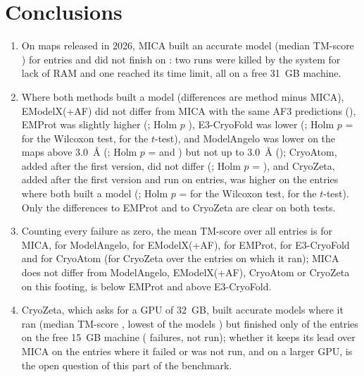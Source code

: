 \section{Conclusions}\label{sec:conclusions}
\begin{enumerate}
\item On \NEntries{} maps released in 2026, MICA built an accurate model (median TM-score \TmMedMica{}) for \NModelMica{} entries and did not finish on \NFailedMica{}: two runs were killed by the system for lack of RAM and one reached its time limit, all on a free 31~GB machine.
\item Where both methods built a model (differences are method minus MICA), EModelX(+AF) did not differ from MICA with the same AF3 predictions (\DiffTmEmodelx{}), EMProt was slightly higher (\DiffTmEmprot{}; Holm $p$ \PwHolmTmEmprot{}), E3-CryoFold was lower (\DiffTmEthree{}; Holm $p$ = \PwHolmTmEthree{} for the Wilcoxon test, \PtHolmTmEthree{} for the $t$-test), and ModelAngelo was lower on the maps above 3.0~\AA{} (\DiffTmAngeloHigh{}; Holm $p$ = \PwHolmTmAngeloHigh{} and \PtHolmTmAngeloHigh{}) but not up to 3.0~\AA{} (\DiffTmAngeloLow{}); CryoAtom, added after the first version, did not differ (\DiffTmCryoatom{}; Holm $p$ = \PwHolmTmCryoatom{}), and CryoZeta, added after the first version and run on \NRanCryozeta{} entries, was higher on the \NPairsTmCryozeta{} entries where both built a model (\DiffTmCryozeta{}; Holm $p$ = \PwHolmTmCryozeta{} for the Wilcoxon test, \PtHolmTmCryozeta{} for the $t$-test). Only the differences to EMProt and to CryoZeta are clear on both tests.
\item Counting every failure as zero, the mean TM-score over all \NEntries{} entries is \ZeroMeanMica{} for MICA, \ZeroMeanAngelo{} for ModelAngelo, \ZeroMeanEmodelx{} for EModelX(+AF), \ZeroMeanEmprot{} for EMProt, \ZeroMeanEthree{} for E3-CryoFold and \ZeroMeanCryoatom{} for CryoAtom (for CryoZeta \ZeroMeanCryozeta{} over the \ZeroNCryozeta{} entries on which it ran); MICA does not differ from ModelAngelo, EModelX(+AF), CryoAtom or CryoZeta on this footing, is below EMProt and above E3-CryoFold.
\item CryoZeta, which asks for a GPU of 32~GB, built accurate models where it ran (median TM-score \TmMedCryozeta{}, lowest of the \NModelCryozeta{} models \TmMinCryozeta{}) but finished only \NModelCryozeta{} of the \NEntries{} entries on the free 15~GB machine (\NFailedCryozeta{} failures, \NNotRunCryozeta{} not run); whether it keeps its lead over MICA on the entries where it failed or was not run, and on a larger GPU, is the open question of this part of the benchmark.

\end{enumerate}
